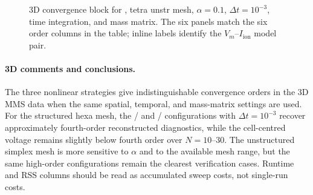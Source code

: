 \begin{figure}[p]
\centering
{}
\caption{3D convergence block for , tetra unstr mesh, $\alpha=0.1$, $\Delta t=10^{-3}$,  time integration, and  mass matrix. The six panels match the six order columns in the table; inline labels identify the $V_m$--$I_{\mathrm{ion}}$ model pair.}
\label{fig:results-3d-jfnk-triangular-unstr-alpha-1p0em01-1p0em03}
\end{figure}
\FloatBarrier

\paragraph{3D comments and conclusions.}
The three nonlinear strategies give indistinguishable convergence orders in the 3D MMS data when the same spatial, temporal, and mass-matrix settings are used. For the structured hexa mesh, the / and / configurations with $\Delta t=10^{-3}$ recover approximately fourth-order reconstructed diagnostics, while the cell-centred voltage remains slightly below fourth order over $N=10$--$30$. The unstructured simplex mesh is more sensitive to $\alpha$ and to the available mesh range, but the same high-order configurations remain the clearest verification cases. Runtime and RSS columns should be read as accumulated sweep costs, not single-run costs.

